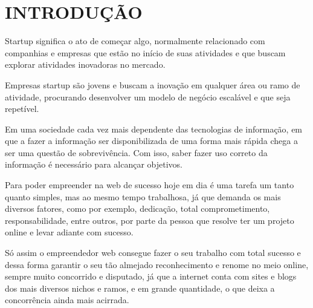 
\chapter{INTRODUÇÃO}
\label{chap:introducao}

Startup significa o ato de começar algo, normalmente relacionado com companhias e empresas que estão no início de suas atividades e que buscam explorar atividades inovadoras no mercado.

Empresas startup são jovens e buscam a inovação em qualquer área ou ramo de atividade, procurando desenvolver um modelo de negócio escalável e que seja repetível. \cite{Startup}

Em uma sociedade cada vez mais dependente das tecnologias de informação, em que a fazer a informação ser disponibilizada de uma forma mais rápida chega a ser uma questão de sobrevivência. Com isso, saber fazer uso correto da informação é necessário para alcançar objetivos.

Para poder empreender na web de sucesso hoje em dia é uma tarefa um tanto quanto simples, mas ao mesmo tempo trabalhosa, já que demanda os mais diversos fatores, como por exemplo, dedicação, total comprometimento, responsabilidade, entre outros, por parte da pessoa que resolve ter um projeto online e levar adiante com sucesso.

Só assim o empreendedor web consegue fazer o seu trabalho com total sucesso e dessa forma garantir o seu tão almejado reconhecimento e renome no meio online, sempre muito concorrido e disputado, já que a internet conta com sites e blogs dos mais diversos nichos e ramos, e em grande quantidade, o que deixa a concorrência ainda mais acirrada.
